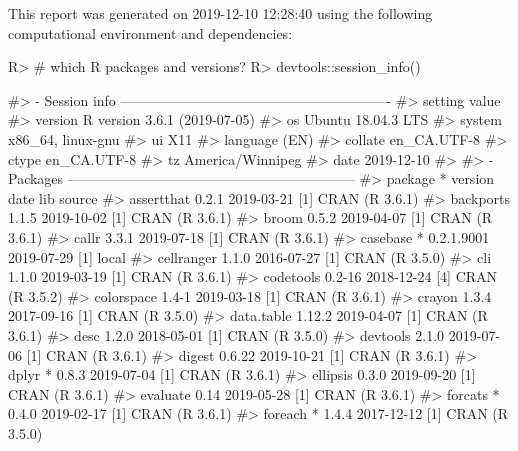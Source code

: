 \documentclass[
]{jss}
\begin{document}
This report was generated on 2019-12-10 12:28:40 using the following
computational environment and dependencies:

\begin{CodeChunk}

\begin{CodeInput}
R> # which R packages and versions?
R> devtools::session_info()
\end{CodeInput}

\begin{CodeOutput}
#> - Session info ----------------------------------------------------------
#>  setting  value                       
#>  version  R version 3.6.1 (2019-07-05)
#>  os       Ubuntu 18.04.3 LTS          
#>  system   x86_64, linux-gnu           
#>  ui       X11                         
#>  language (EN)                        
#>  collate  en_CA.UTF-8                 
#>  ctype    en_CA.UTF-8                 
#>  tz       America/Winnipeg            
#>  date     2019-12-10                  
#> 
#> - Packages --------------------------------------------------------------
#>  package     * version    date       lib source                          
#>  assertthat    0.2.1      2019-03-21 [1] CRAN (R 3.6.1)                  
#>  backports     1.1.5      2019-10-02 [1] CRAN (R 3.6.1)                  
#>  broom         0.5.2      2019-04-07 [1] CRAN (R 3.6.1)                  
#>  callr         3.3.1      2019-07-18 [1] CRAN (R 3.6.1)                  
#>  casebase    * 0.2.1.9001 2019-07-29 [1] local                           
#>  cellranger    1.1.0      2016-07-27 [1] CRAN (R 3.5.0)                  
#>  cli           1.1.0      2019-03-19 [1] CRAN (R 3.6.1)                  
#>  codetools     0.2-16     2018-12-24 [4] CRAN (R 3.5.2)                  
#>  colorspace    1.4-1      2019-03-18 [1] CRAN (R 3.6.1)                  
#>  crayon        1.3.4      2017-09-16 [1] CRAN (R 3.5.0)                  
#>  data.table    1.12.2     2019-04-07 [1] CRAN (R 3.6.1)                  
#>  desc          1.2.0      2018-05-01 [1] CRAN (R 3.5.0)                  
#>  devtools      2.1.0      2019-07-06 [1] CRAN (R 3.6.1)                  
#>  digest        0.6.22     2019-10-21 [1] CRAN (R 3.6.1)                  
#>  dplyr       * 0.8.3      2019-07-04 [1] CRAN (R 3.6.1)                  
#>  ellipsis      0.3.0      2019-09-20 [1] CRAN (R 3.6.1)                  
#>  evaluate      0.14       2019-05-28 [1] CRAN (R 3.6.1)                  
#>  forcats     * 0.4.0      2019-02-17 [1] CRAN (R 3.6.1)                  
#>  foreach     * 1.4.4      2017-12-12 [1] CRAN (R 3.5.0)                  

\end{CodeOutput}
\end{CodeChunk}
\end{document}
